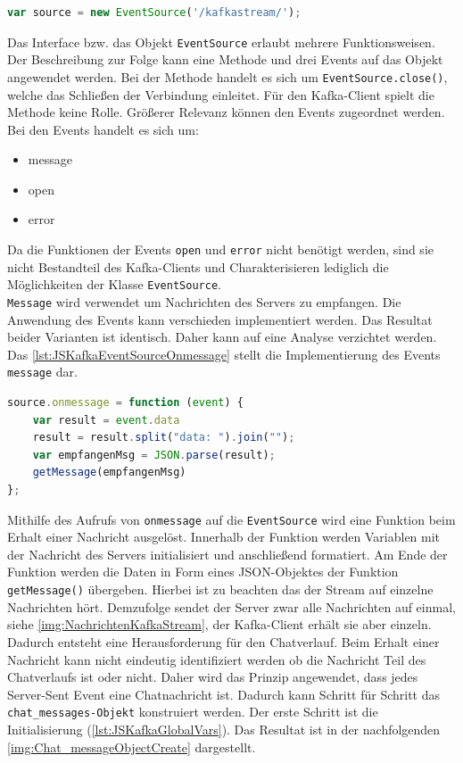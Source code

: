 \documentclass[a4paper,titlepage,halfparskip,12pt]{scrreprt}
\begin{document}
\begin{onehalfspacing}
\begin{lstlisting}[language=Javascript,caption=Erstellen des Objektes mit dem entsprechenden Endpunkt ,label={lst:JSKafkaEventSource}]
var source = new EventSource('/kafkastream/');
\end{lstlisting}
Das Interface bzw. das Objekt \texttt{EventSource} erlaubt mehrere Funktionsweisen. Der Beschreibung zur Folge kann eine Methode und drei Events auf das Objekt angewendet werden. Bei der Methode handelt es sich um \texttt{EventSource.close()}, welche das Schließen der Verbindung einleitet. Für den Kafka-Client spielt die Methode keine Rolle. Größerer Relevanz können den Events zugeordnet werden. Bei den Events handelt es sich um:
\begin{itemize}
	\item message
	\item open
	\item error
\end{itemize}
Da die Funktionen der Events \texttt{open} und \texttt{error} nicht benötigt werden, sind sie nicht Bestandteil des Kafka-Clients und Charakterisieren lediglich die Möglichkeiten der Klasse \texttt{EventSource}. \cite{w3schoolsServerSentEvent}\\
\texttt{Message} wird verwendet um Nachrichten des Servers zu empfangen. Die Anwendung des Events kann verschieden implementiert werden. Das Resultat beider Varianten ist identisch. Daher kann auf eine Analyse verzichtet werden. Das \autoref{lst:JSKafkaEventSourceOnmessage} stellt die Implementierung des Events \texttt{message} dar. 
\begin{lstlisting}[language=Javascript,caption=Reagieren auf eine Nachricht ,label={lst:JSKafkaEventSourceOnmessage}]
source.onmessage = function (event) {
	var result = event.data
	result = result.split("data: ").join("");
	var empfangenMsg = JSON.parse(result);
	getMessage(empfangenMsg)    
};
\end{lstlisting}
Mithilfe des Aufrufs von \texttt{onmessage} auf die \texttt{EventSource} wird eine Funktion beim Erhalt einer Nachricht ausgelöst. Innerhalb der Funktion werden Variablen mit der Nachricht des Servers initialisiert und anschließend formatiert. Am Ende der Funktion werden die Daten in Form eines JSON-Objektes der Funktion \texttt{getMessage()} übergeben. Hierbei ist zu beachten das der Stream auf einzelne Nachrichten hört. Demzufolge sendet der Server zwar alle Nachrichten auf einmal, siehe \autoref{img:NachrichtenKafkaStream}, der Kafka-Client erhält sie aber einzeln. Dadurch entsteht eine Herausforderung für den Chatverlauf. Beim Erhalt einer Nachricht kann nicht eindeutig identifiziert werden ob die Nachricht Teil des Chatverlaufs ist oder nicht. Daher wird das Prinzip angewendet, dass jedes Server-Sent Event eine Chatnachricht ist. Dadurch kann Schritt für Schritt das \texttt{chat\_messages-Objekt} konstruiert werden. Der erste Schritt ist die Initialisierung (\autoref{lst:JSKafkaGlobalVars}). Das Resultat ist in der nachfolgenden \autoref{img:Chat_messageObjectCreate} dargestellt.

\end{onehalfspacing}
\end{document}
